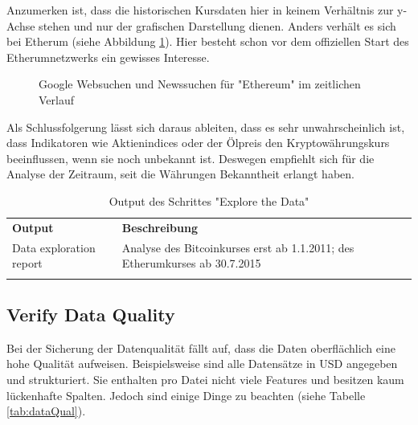 Anzumerken ist, dass die historischen Kursdaten hier in keinem Verhältnis zur y-Achse stehen und nur der grafischen Darstellung dienen.
Anders verhält es sich bei Etherum (siehe Abbildung \ref{fig:PublicInterestETH}). Hier besteht schon vor dem offiziellen Start des Etherumnetzwerks\citep{tual_ethereum_2015} ein gewisses Interesse.
\begin{figure}[H]
\centering
{}
\caption{Google Websuchen und Newssuchen für "Ethereum" im zeitlichen Verlauf}
\label{fig:PublicInterestETH}
\end{figure}
Als Schlussfolgerung lässt sich daraus ableiten, dass es sehr unwahrscheinlich ist, dass Indikatoren wie Aktienindices oder der Ölpreis den Kryptowährungskurs beeinflussen, wenn sie noch unbekannt ist. Deswegen empfiehlt sich für die Analyse der Zeitraum, seit die Währungen Bekanntheit erlangt haben. 

\begin{longtable}[H]{|p{}|p{12cm}|}
\hline
\textbf{Output} & \textbf{Beschreibung} \\ 
\hhline{==}
Data exploration report & Analyse des Bitcoinkurses erst ab 1.1.2011; des Etherumkurses ab 30.7.2015\\
\hline
\caption{Output des Schrittes "Explore the Data"}
\end{longtable}


\subsection{Verify Data Quality}
Bei der Sicherung der Datenqualität fällt auf, dass die Daten oberflächlich eine hohe Qualität aufweisen. Beispielsweise sind alle Datensätze in USD angegeben und strukturiert. Sie enthalten pro Datei nicht viele Features und besitzen kaum lückenhafte Spalten. Jedoch sind einige Dinge zu beachten (siehe Tabelle \ref{tab:dataQual}).

